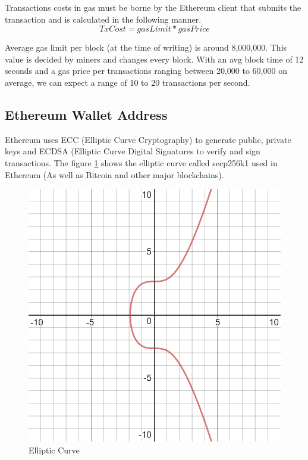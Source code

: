\documentclass[11pt,openright]{report}
\begin{document}
Transactions costs in gas must be borne by the Ethereum client that submits the transaction and is calculated in the following manner.
\begin{equation}
    TxCost = gasLimit * gasPrice
\end{equation}

Average gas limit per block (at the time of writing) is around 8,000,000. This value is decided by miners and changes every block. With an avg block time of 12 seconds and a gas price per transactions ranging between 20,000 to 60,000 on average, we can expect a range of 10 to 20 transactions per second. 

\subsection{Ethereum Wallet Address}
Ethereum uses ECC (Elliptic Curve Cryptography) to generate public, private keys and ECDSA (Elliptic Curve Digital Signatures to verify and sign transactions. The figure \ref{fig:elliptic_curve} shows the elliptic curve called secp256k1 used in Ethereum (As well as Bitcoin and other major blockchains).

\begin{figure}
    \centering
    \includegraphics[scale=0.5]{images/ecc.png}
    \caption{Elliptic Curve}
    \label{fig:elliptic_curve}
\end{figure}
\end{document}
